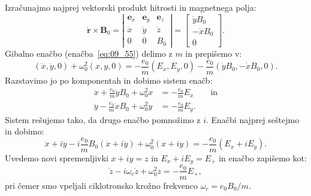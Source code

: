 Izračunajmo najprej vektorski produkt hitrosti in magnetnega polja:
\begin{equation}
\dot{\mathbf{r}} \times \mathbf{B}_0 = 
\left|
\begin{array}{ccc}
\mathbf{e}_x & \mathbf{e}_y & \mathbf{e}_z\\
\dot{x} & \dot{y} & \dot{z}\\
0 & 0 & B_{0}
\end{array}\right|
= 
\left[
\begin{array}{c}
\dot{y} B_0\\
-\dot{x} B_0\\
0
\end{array}\right]\!\!.
\label{eq:09_60}
\end{equation}
Gibalno enačbo (enačba~\ref{eq:09_55}) delimo z $m$ in prepišemo v:
\begin{equation}
\left(\ddot{x},\ddot{y},0\right) + \omega_0^2 (x,y,0)= -\frac{e_0}{m}(E_x, E_y, 0) - 
\frac{e_0}{m}\left( \dot{y}B_0, -\dot{x} B_0, 0\right).
\label{eq:09_61}
\end{equation}
Razstavimo jo po komponentah in dobimo sistem enačb:
\begin{align}
\ddot{x} + \frac{e_0}{m} \dot{y} B_0 + \omega_0^2 x &= -\frac{e_0}{m}E_x \qquad \mathrm{in}\label{eq:09_52a} \\
\ddot{y} - \frac{e_0}{m} \dot{x} B_0 + \omega_0^2 y &= -\frac{e_0}{m}E_y.
\label{eq:09_52b}
\end{align}
Sistem rešujemo tako, da drugo enačbo pomnožimo z $i$. Enačbi najprej seštejmo in dobimo:
\begin{equation}
\ddot{x} + i\ddot{y} -i \frac{e_0}{m}B_0 (\dot{x} + i\dot{y}) + \omega_0^2 (x+iy) = -\frac{e_0}{m}(E_x+iE_y).
\label{eq:09_62}
\end{equation}
Uvedemo novi spremenljivki $x + iy = z$ in $E_x+iE_y = E_+$ in enačbo zapišemo kot:
\begin{equation}
\ddot{z} -i \omega_{c}\dot{z} + \omega_0^2 z = -\frac{e_0}{m}E_+,
\label{eq:09_63}
\end{equation}
pri čemer smo vpeljali ciklotronsko krožno frekvenco $\omega_{c} = e_0B_0/m$.

